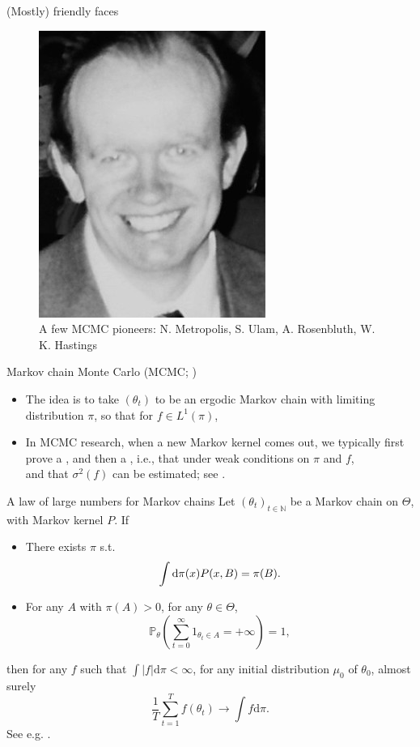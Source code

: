 \documentclass[10pt]{beamer}
\let\oldcitep=\citep
\renewcommand\citep[1]{\hyperlink{#1}{\textcolor{vert}{\oldcitep{#1}}}}
\begin{document}
\begin{frame}{(Mostly) friendly faces}
\begin{figure}
  \includegraphics[height=.3\textheight]{Figures/hastings}
  \caption{A few MCMC pioneers: N. Metropolis, S. Ulam, A. Rosenbluth, W. K. Hastings}
\end{figure}\end{frame}

\begin{frame}{Markov chain Monte Carlo (MCMC; \citep{RoCa04})}
\begin{itemize}
  \item The idea is to take $(\theta_t)$ to be an ergodic Markov chain with limiting distribution $\pi$, so that for $f\in L^1(\pi)$,
  $$$$
  \vfill
  \item In MCMC research, when a new Markov kernel comes out, we typically first prove a , and then a , i.e., that under weak conditions on $\pi$ and $f$,
  $$$$
  \vfill
  and that $\sigma^2(f)$ can be estimated; see \citep{DoMoSt14}.
  \end{itemize}
\end{frame}

\begin{frame}{A law of large numbers for Markov chains}
  Let $(\theta_t)_{t\in\mathbb N}$ be a Markov chain on $\mathcal \Theta$, with Markov kernel $P$. If
  \begin{itemize}
    \item There exists $\pi$ s.t. 
    $$
    \int {\rm d}\pi(x) P(x, B) = \pi(B).
    $$
    \item For any $A$ with $\pi(A)>0$, for any $\theta\in \Theta$,
    $$ 
    \mathbb{P}_{\theta} \left(\sum_{t=0}^\infty 1_{\theta_t\in A} = +\infty\right) = 1,
    $$
  \end{itemize}
  then for any $f$ such that $\int \vert f\vert \mathrm{d} \pi <\infty$, for any initial distribution $\mu_0$ of $\theta_0$, almost surely
  $$
  \frac{1}{T} \sum_{t=1}^T f(\theta_t) \rightarrow \int f\mathrm{d}\pi.
  $$
  See e.g. \citep{DoMoSt14}.
\end{frame}
\end{document}
